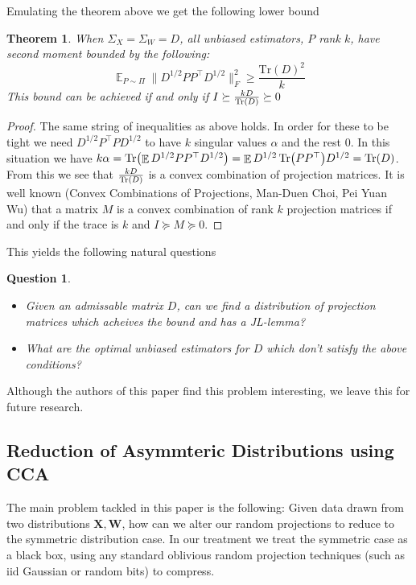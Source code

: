 \documentclass{article}
\newtheorem{theorem}{Theorem}[section]
\newtheorem*{question*}{Question}
\theoremstyle{definition}
\theoremstyle{plain}
\DeclareMathOperator{\E}{\mathbb{E}}
\DeclarePairedDelimiter\parentheses{\lparen}{\rparen}
\newcommand{\Tr}[1]{\operatorname{Tr} \parentheses*{#1}}
\begin{document}
Emulating the theorem above we get the following lower bound
\begin{theorem} \label{thm:weighted}
When $\Sigma_X = \Sigma_W = D$, all unbiased estimators, $P$ rank $k$, have second moment bounded by the following:
\[\E_{P\sim \Pi} \| D^{1/2} P P^\top D^{1/2} \|_F^2 \geq \frac{\text{Tr}(D)^2}{k}\]
This bound can be achieved if and only if $I \succeq \frac{k D}{\Tr{D}} \succeq 0$
\end{theorem}
\begin{proof}
The same string of inequalities as above holds. In order for these to be tight we need $D^{1/2} P^\top P D^{1/2}$ to have $k$ singular values $\alpha$ and the rest $0$. 
In this situation we have $k \alpha =  \Tr{\E D^{1/2} P P^\top D^{1/2}} = \E D^{1/2} \Tr{P P^\top} D^{1/2} = \Tr{D}$. From this we see that $\frac{k D}{\Tr{D}}$ is a convex combination of projection matrices. It is well known (Convex Combinations of Projections, Man-Duen Choi, Pei Yuan Wu) that a matrix $M$ is a convex combination of rank $k$ projection matrices if and only if the trace is $k$ and $I \succeq M \succeq 0$.
\end{proof}

This yields the following natural questions
\begin{question*}~
\begin{itemize}\label{ques:symmetric}
    \item Given an admissable matrix $D$, can we find a distribution of projection matrices which acheives the bound and has a JL-lemma?
    \item What are the optimal unbiased estimators for $D$ which don't satisfy the above conditions?
\end{itemize}
\end{question*}
Although the authors of this paper find this problem interesting, we leave this for future research.

\subsection{Reduction of Asymmteric Distributions using CCA}
The main problem tackled in this paper is the following: Given data drawn from two distributions $\mathbf{X}, \mathbf{W}$, how can we alter our random projections to reduce to the symmetric distribution case. In our treatment we treat the symmetric case as a black box, using any standard oblivious random projection techniques (such as iid Gaussian or random bits) to compress.
\end{document}
